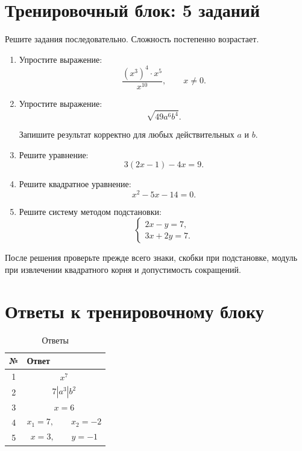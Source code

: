 \documentclass[a4paper,12pt]{article}
\begin{document}
\clearpage

\section{Тренировочный блок: 5 заданий}

Решите задания последовательно. Сложность постепенно возрастает.

\begin{enumerate}

\item
Упростите выражение:
\[
\frac{(x^3)^4\cdot x^5}{x^{10}},
\qquad x\ne0.
\]

\item
Упростите выражение:
\[
\sqrt{49a^6b^4}.
\]

Запишите результат корректно для любых действительных \(a\) и \(b\).

\item
Решите уравнение:
\[
3(2x-1)-4x=9.
\]

\item
Решите квадратное уравнение:
\[
x^2-5x-14=0.
\]

\item
Решите систему методом подстановки:
\[
\begin{cases}
2x-y=7,\\
3x+2y=7.
\end{cases}
\]

\end{enumerate}

\vfill

{\small\color{softgray}
После решения проверьте прежде всего знаки, скобки при подстановке,
модуль при извлечении квадратного корня и допустимость сокращений.}

\clearpage

\section{Ответы к тренировочному блоку}

\renewcommand{\arraystretch}{1.45}

\begin{table}[ht]
\centering
\caption{Ответы}
\begin{tabularx}{\linewidth}{@{}c X@{}}
\toprule
\textbf{№} & \textbf{Ответ} \\
\midrule

1 &
\[
x^7
\]
\\

2 &
\[
7|a^3|b^2
\]
\\

3 &
\[
x=6
\]
\\

4 &
\[
x_1=7,\qquad x_2=-2
\]
\\

5 &
\[
x=3,\qquad y=-1
\]
\\

\bottomrule
\end{tabularx}
\end{table}
\end{document}
